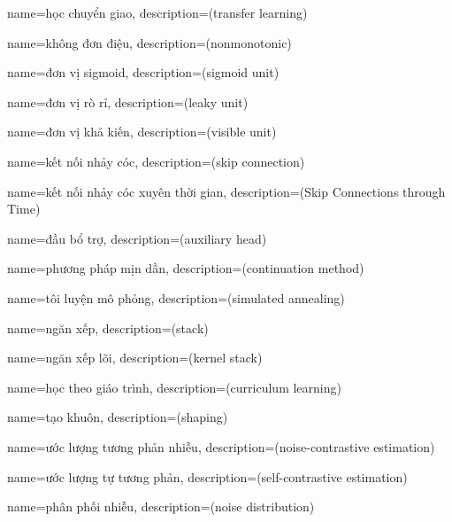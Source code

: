 
{
    name={học chuyển giao},
    description={(transfer learning)}
}

{
    name={không đơn điệu},
    description={(nonmonotonic)}
}

{
    name={đơn vị sigmoid},
    description={(sigmoid unit)}
}

{
    name={đơn vị rò rỉ},
    description={(leaky unit)}
}

{
    name={đơn vị khả kiến},
    description={(visible unit)}
}

{
    name={kết nối nhảy cóc},
    description={(skip connection)}
}

{
    name={kết nối nhảy cóc xuyên thời gian},
    description={(Skip Connections through Time)}
}

{
    name={đầu bổ trợ},
    description={(auxiliary head)}
}

{
    name={phương pháp mịn dần},
    description={(continuation method)}
}

{
    name={tôi luyện mô phỏng},
    description={(simulated annealing)}
}

{
    name={ngăn xếp},
    description={(stack)}
}

{
    name={ngăn xếp lõi},
    description={(kernel stack)}
}

{
    name={học theo giáo trình},
    description={(curriculum learning)}
}

{
    name={tạo khuôn},
    description={(shaping)}
}

{
    name={ước lượng tương phản nhiễu},
    description={(noise-contrastive estimation)}
}


{
    name={ước lượng tự tương phản},
    description={(self-contrastive estimation)}
}

{
    name={phân phối nhiễu},
    description={(noise distribution)}
}

